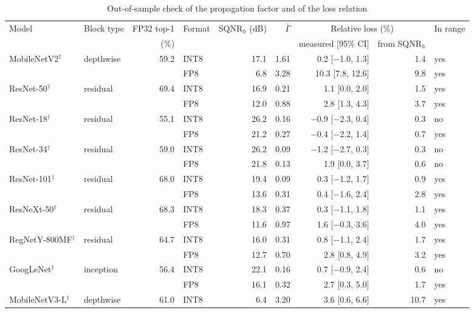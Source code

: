 \documentclass[pdflatex,sn-mathphys-num]{sn-jnl}%
\theoremstyle{thmstyleone}%
\theoremstyle{thmstyletwo}%
\theoremstyle{thmstylethree}%
\begin{document}
\begin{table}
\footnotesize\setlength{\tabcolsep}{4pt}
\caption{Out-of-sample check of the propagation factor and of the loss relation}\label{tab:extcheck}
\begin{tabular}{@{}llrlrrrrl@{}}
\toprule
Model & Block type & FP32 top-1 & Format & SQNR$_h$ (dB) & $\bar\Gamma$ & \multicolumn{2}{c}{Relative loss (\%)} & In range \\
\cmidrule{7-8}
 & & (\%) & & & & measured [95\% CI] & from SQNR$_h$ & \\
\midrule
MobileNetV2$^\dagger$ & depthwise & 59.2 & INT8 & 17.1 & 1.61 & 0.2 [$-$1.0, 1.3] & 1.4 & yes \\
 &  &  & FP8 & 6.8 & 3.28 & 10.3 [7.8, 12.6] & 9.8 & yes \\
ResNet-50$^\dagger$ & residual & 69.4 & INT8 & 16.9 & 0.21 & 1.1 [0.0, 2.0] & 1.5 & yes \\
 &  &  & FP8 & 12.0 & 0.88 & 2.8 [1.3, 4.3] & 3.7 & yes \\
ResNet-18$^\dagger$ & residual & 55.1 & INT8 & 26.2 & 0.16 & $-$0.9 [$-$2.3, 0.4] & 0.3 & no \\
 &  &  & FP8 & 21.2 & 0.27 & $-$0.4 [$-$2.2, 1.4] & 0.7 & yes \\
ResNet-34$^\dagger$ & residual & 59.0 & INT8 & 26.2 & 0.09 & $-$1.2 [$-$2.7, 0.3] & 0.3 & no \\
 &  &  & FP8 & 21.8 & 0.13 & 1.9 [0.0, 3.7] & 0.6 & no \\
ResNet-101$^\dagger$ & residual & 68.0 & INT8 & 19.4 & 0.09 & 0.3 [$-$1.2, 1.7] & 0.9 & yes \\
 &  &  & FP8 & 13.6 & 0.31 & 0.4 [$-$1.6, 2.4] & 2.8 & yes \\
ResNeXt-50$^\dagger$ & residual & 68.3 & INT8 & 18.3 & 0.37 & 0.3 [$-$1.1, 1.8] & 1.1 & yes \\
 &  &  & FP8 & 11.6 & 0.97 & 1.6 [$-$0.3, 3.6] & 4.0 & yes \\
RegNetY-800MF$^\dagger$ & residual & 64.7 & INT8 & 16.0 & 0.31 & 0.8 [$-$1.1, 2.4] & 1.7 & yes \\
 &  &  & FP8 & 12.7 & 0.70 & 2.8 [0.8, 4.9] & 3.2 & yes \\
GoogLeNet$^\dagger$ & inception & 56.4 & INT8 & 22.1 & 0.16 & 0.7 [$-$0.9, 2.4] & 0.6 & no \\
 &  &  & FP8 & 16.1 & 0.32 & 2.7 [0.3, 5.0] & 1.7 & yes \\
MobileNetV3-L$^\dagger$ & depthwise & 61.0 & INT8 & 6.4 & 3.20 & 3.6 [0.6, 6.6] & 10.7 & yes \\

\end{tabular}
\end{table}
\end{document}

